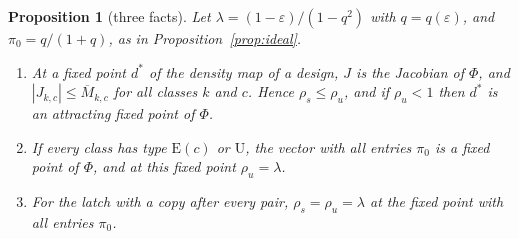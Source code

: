 \documentclass[11pt]{amsart}
\newtheorem{proposition}[theorem]{Proposition}
\theoremstyle{definition}
\theoremstyle{remark}
\newcommand{\eps}{\varepsilon}
\begin{document}
\begin{proposition}[three facts]\label{prop:designs}
Let $\lambda=(1-\eps)/(1-q^2)$ with $q=q(\eps)$, and $\pi_0=q/(1+q)$, as in
Proposition~\ref{prop:ideal}.
\begin{enumerate}[label=(\alph*),leftmargin=2.4em]
\item At a fixed point $d^*$ of the density map of a design, $J$ is the Jacobian of $\Phi$, and
$|J_{k,c}|\le\overline M_{k,c}$ for all classes $k$ and $c$. Hence $\rho_s\le\rho_u$, and if
$\rho_u<1$ then $d^*$ is an attracting fixed point of $\Phi$.
\item If every class has type $\mathrm E(c)$ or $\mathrm U$, the vector with all entries $\pi_0$
is a fixed point of $\Phi$, and at this fixed point $\rho_u=\lambda$.
\item For the latch with a copy after every pair, $\rho_s=\rho_u=\lambda$ at the fixed point with
all entries $\pi_0$.
\end{enumerate}
\end{proposition}
\end{document}
